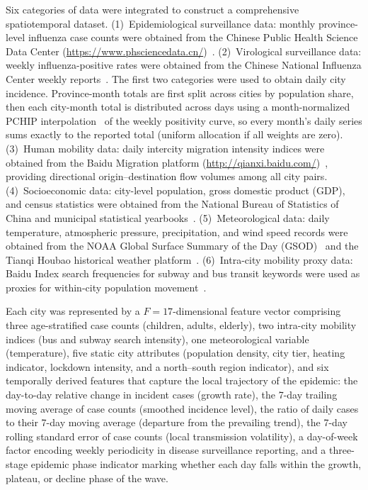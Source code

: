 \documentclass[10pt,letterpaper]{article}
\begin{document}
	Six categories of data were integrated to construct a comprehensive spatiotemporal dataset. (1)~Epidemiological surveillance data: monthly province-level influenza case counts were obtained from the Chinese Public Health Science Data Center
	(\url{https://www.phsciencedata.cn/})~\cite{cdc2020}. (2)~Virological surveillance data: weekly influenza-positive rates were obtained from the Chinese National Influenza Center weekly
	reports~\cite{cnfi2020}. The first two categories were used to obtain daily city incidence. Province-month totals are first split across cities by population share, then each city-month total is distributed across days using a month-normalized PCHIP interpolation~\cite{fritsch1980} of the weekly positivity curve, so every month's daily series sums exactly to the reported total (uniform allocation if all weights are zero).
	(3)~Human mobility data: daily intercity migration intensity
	indices were obtained from the Baidu Migration platform	(\url{http://qianxi.baidu.com/})~\cite{baidu2020}, providing directional origin--destination
	flow volumes among all city pairs. (4)~Socioeconomic data: city-level population,
	gross domestic product (GDP), and census statistics were obtained from the National
	Bureau of Statistics of China and municipal statistical yearbooks~\cite{stats2020}.
	(5)~Meteorological data: daily temperature, atmospheric pressure, precipitation, and
	wind speed records were obtained from the NOAA Global Surface Summary of the Day
	(GSOD)~\cite{noaa2020} and the Tianqi Houbao historical weather platform~\cite{tianqihoubao}.
	(6)~Intra-city mobility proxy data: Baidu Index search frequencies for subway and bus
	transit keywords were used as proxies for within-city population movement~\cite{baiduindex}.
	
	Each city was represented by a $F = 17$-dimensional feature vector comprising
	three age-stratified case counts (children, adults, elderly), two intra-city mobility
	indices (bus and subway search intensity), one meteorological variable (temperature),
	five static city attributes (population density, city tier, heating indicator, lockdown
	intensity, and a north--south region indicator), and six temporally derived features that capture the local trajectory of
	the epidemic: the day-to-day relative change in incident cases (growth
	rate), the 7-day trailing moving average of case counts (smoothed
	incidence level), the ratio of daily cases to their 7-day moving
	average (departure from the prevailing trend), the 7-day rolling
	standard error of case counts (local transmission volatility), a
	day-of-week factor encoding weekly periodicity in disease surveillance
	reporting, and a three-stage epidemic phase indicator marking whether
	each day falls within the growth, plateau, or decline phase of the wave.
	
\end{document}
